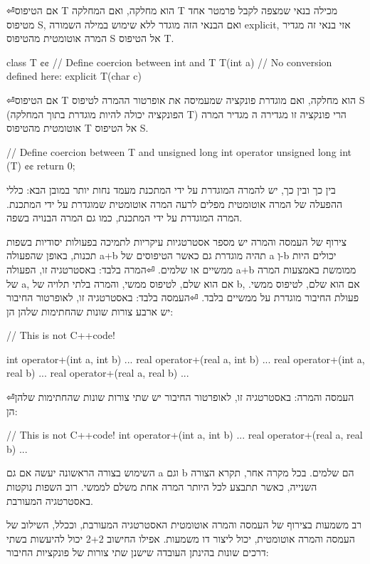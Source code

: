 \begin{טבלא}[!htbp]
⏎אם הטיפוס T הוא מחלקה, ואם המחלקה T מכילה בנאי שמצפה לקבל פרמטר אחד מטיפוס S, ואם הבנאי הזה מוגדר ללא שימוש במילה השמורה explicit, אזי בנאי זה מגדיר המרה אוטומטית מהטיפוס S אל הטיפוס T.

      class T {¢¢
        // Define coercion between int and T
        T(int a) {}
        // No conversion defined here:
        explicit T(char c) {}
      }

⏎אם הטיפוס T הוא מחלקה, ואם מוגדרת פונקציה שמעמיסה את אופרטור ההמרה לטיפוס S (הפונקציה יכולה להיות מוגדרת בתוך המחלקה T) הרי פונקציה זו מגדירה ה מגדיר המרה אוטומטית מהטיפוס T אל הטיפוס S.

      // Define coercion between T and unsigned long int
      operator unsigned long int (T) {¢¢
        return 0;
      }

      בין כך ובין כך, יש להמרה המוגדרת על ידי המתכנת מעמד נחות יותר במובן הבא: כללי ההפעלה של המרה אוטומטית מפלים לרעה המרה אוטומטית שמוגדרת על ידי המתכנת. המרה המוגדרת על ידי המתכנת, כמו גם המרה הבנויה בשפה.

      צירוף של העמסה והמרה
      יש מספר אסטרטגיות עיקריות לתמיכה בפעולות יסודיות בשפות תכנות, באופן שהפעולה a+b תהיה מוגדרת גם כאשר הטיפוסים של a וְ-b יכולים היות ממשיים או שלמים.
⏎המרה בלבד: באסטרטגיה זו, הפעולה a+b ממומשת באמצעות המרה של a, אם הוא שלם, לטיפוס ממשי, והמרה בלתי תלויה של b, אם הוא שלם, לטיפוס ממשי. פעולת החיבור מוגדרת על ממשיים בלבד.
⏎העמסה בלבד: באסטרטגיה זו, לאופרטור החיבור יש ארבע צורות שונות שהחתימות שלהן הן:

      // This is not C++code!

      int operator+(int a, int b) {...}
      real operator+(real a, int b) {...}
      real operator+(int a, real b) {...}
      real operator+(real a, real b) {...}

⏎העמסה והמרה: באסטרטגיה זו, לאופרטור החיבור יש שתי צורות שונות שהחתימות שלהן הן:

      // This is not C++code!
      int operator+(int a, int b) {...}
      real operator+(real a, real b) {...}

      השימוש בצורה הראשונה יעשה אם גם a וגם b הם שלמים. בכל מקרה אחר, תקרא הצורה השנייה, כאשר תתבצע לכל היותר המרה אחת משלם לממשי.
      רוב השפות נוקטות באסטרטגיה המעורבת.

      רב משמעות בצירוף של העמסה והמרה אוטומטית
      האסטרטגיה המעורבת, וככלל, השילוב של העמסה והמרה אוטומטית, יכול ליצור דו משמעות. אפילו החישוב 2+2 יכול להיעשות בשתי דרכים שונות בהינתן העובדה שישנן שתי צורות של פונקציות החיבור:


\end{טבלא}
